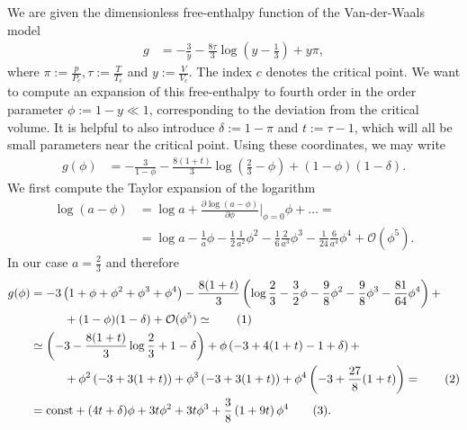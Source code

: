 \documentclass[english, parskip=full]{scrartcl}
\title{\titel}
\author{\autor}
\date{\today}
\newcommand\numberthis{\addtocounter{equation}{1}\tag{\theequation}}
\newcommand{\kla}{}
\newcommand{\tecxt}{}
\begin{document}
\maketitle  %

We are given the dimensionless free-enthalpy function  of the Van-der-Waals model
\begin{align}
g &= -\frac{3}{y} - \frac{8\tau}{3}\log \kla\left( y - \frac{1}{3} \right) + y\pi,
\end{align}
where $\pi := \frac{p}{P_c}, \tau := \frac{T}{T_c}$ and $y := \frac{V}{V_c}$.
The index $c$ denotes the critical point.
We want to compute an expansion of this free-enthalpy to fourth order in the order parameter $\phi := 1 - y \ll 1$, corresponding to the deviation from the critical volume.
It is helpful to also introduce $\delta := 1 - \pi$ and $t:= \tau - 1$, which will all be small parameters near the critical point.
Using these coordinates, we may write 
\begin{align}
g(\phi) &= -\frac{3}{1-\phi} - \frac{8(1+t)}{3} \log\kla\left( \frac{2}{3} - \phi \right) + (1-\phi)(1-\delta).
\end{align}
We first compute the Taylor expansion of the logarithm
\begin{align}
\log\kla\left( a - \phi \right) &= \log a + \frac{\partial \log (a-\phi)}{\partial\phi}\Big\vert_{\phi=0} \phi + \dots = \\
&= \log a - \frac{1}{a}\phi - \frac{1}{2}\frac{1}{a^2}\phi^2 - \frac{1}{6}\frac{2}{a^3}\phi^3 - \frac{1}{24}\frac{6}{a^4}\phi^4 + \mathcal{O}(\phi^5).
\end{align}
In our case $a=\frac{2}{3}$ and therefore
\begin{align*}
g(\phi) &= -3\kla\left( 1+\phi+\phi^2+\phi^3+\phi^4 \right) - \frac{8(1+t)}{3} \kla\left( \log \frac{2}{3} - \frac{3}{2}\phi - \frac{9}{8}\phi^2 - \frac{9}{8}\phi^3 - \frac{81}{64}\phi^4 \right) +\\
&\hspace{1cm} + (1-\phi)(1-\delta) + \mathcal{O}(\phi^5) \simeq \numberthis \\
&\simeq \kla\left( -3 - \frac{8(1+t)}{3}\log\frac{2}{3} + 1-\delta \right) + \phi \kla\left( -3 + 4(1+t) - 1+\delta \right) + \\
&\hspace{1cm} + \phi^2\kla\left( -3 + 3(1+t) \right) + \phi^3\kla\left( -3 + 3(1+t) \right) + \phi^4\kla\left( -3 + \frac{27}{8}(1+t) \right) = \numberthis \\
&= \tecxt\text{const} + (4t+\delta)\phi + 3t\phi^2 + 3t\phi^3 + \frac{3}{8}\kla\left( 1 + 9t \right) \phi^4 \numberthis.
\end{align*}
\end{document}
